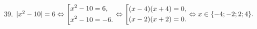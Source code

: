 39. $|x^2-10|=6\Leftrightarrow\left[\begin{gathered} x^2-10=6,\hfill\\
      x^2-10=-6.\hfill \end{gathered}\right.\Leftrightarrow\left[\begin{gathered} (x-4)(x+4)=0,\hfill\\
      (x-2)(x+2)=0.\hfill \end{gathered}\right. \Leftrightarrow x\in\{-4; -2; 2; 4\}.$\\
